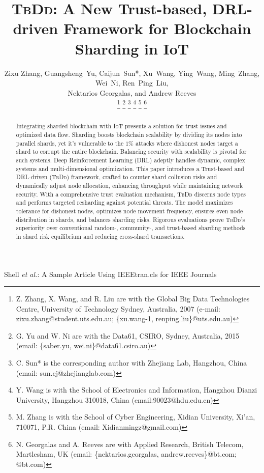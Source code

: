 \documentclass[lettersize,journal]{IEEEtran}
\begin{document}
\title{\textsc{TbDd}: A New Trust-based, DRL-driven Framework for Blockchain Sharding in IoT}




\author{
        Zixu Zhang, Guangsheng~Yu, Caijun~Sun*, Xu~Wang, Ying~Wang,
        Ming~Zhang, Wei~Ni, Ren~Ping~Liu,\\
        Nektarios Georgalas, and Andrew Reeves

   
\thanks{Z. Zhang, X. Wang, and R. Liu are with the Global Big Data Technologies Centre, University of Technology Sydney, Australia, 2007 (e-mail: zixu.zhang@student.uts.edu.au; \{xu.wang-1, renping.liu\}@uts.edu.au)}
\thanks{G. Yu and W. Ni are with the Data61, CSIRO, Sydney, Australia, 2015 (email: \{saber.yu, wei.ni\}@data61.csiro.au)}
\thanks{C. Sun* is the corresponding author with Zhejiang Lab, Hangzhou, China (email: sun.cj@zhejianglab.com)}
\thanks{Y. Wang is with the School of Electronics and Information, Hangzhou Dianzi University, Hangzhou 310018, China (email:90023@hdu.edu.cn)}
\thanks{M. Zhang is with the School of Cyber Engineering, Xidian University, Xi’an, 710071, P.R. China (email: Xidianmingz@gmail.com)}
\thanks{N. Georgalas and A. Reeves are with Applied Research, British Telecom, Martlesham, UK (email: \{nektarios.georgalas, andrew.reeves\}@bt.com; @bt.com)}
}

%
{Shell \MakeLowercase{\textit{et al.}}: A Sample Article Using IEEEtran.cls for IEEE Journals}

\maketitle

\begin{abstract}
Integrating sharded blockchain with IoT presents a solution for trust issues and optimized data flow. Sharding boosts blockchain scalability by dividing its nodes into parallel shards, yet it's vulnerable to the $1\%$ attacks where dishonest nodes target a shard to corrupt the entire blockchain. Balancing security with scalability is pivotal for such systems. Deep Reinforcement Learning (DRL) adeptly handles dynamic, complex systems and multi-dimensional optimization.
This paper introduces a Trust-based and DRL-driven (\textsc{TbDd}) framework, crafted to counter shard collusion risks and dynamically adjust node allocation, enhancing throughput while maintaining network security. With a comprehensive trust evaluation mechanism, \textsc{TbDd} discerns node types and performs targeted resharding against potential threats. The model maximizes tolerance for dishonest nodes, optimizes node movement frequency, ensures even node distribution in shards, and balances sharding risks. Rigorous evaluations prove \textsc{TbDd}'s superiority over conventional random-, community-, and trust-based sharding methods in shard risk equilibrium and reducing cross-shard transactions.
 
\end{abstract}
\end{document}
